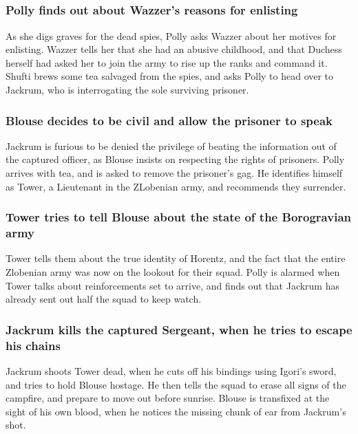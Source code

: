 \subsection{}
\subsubsection{\Gls{Polly} finds out about \Gls{Wazzer}'s reasons for enlisting}
As she digs graves for the dead spies, \Gls{Polly} asks \Gls{Wazzer} about her motives for
enlisting. \Gls{Wazzer} tells her that she had an abusive childhood, and that \Gls{Duchess} herself
had asked her to join the army to rise up the ranks and command it. \Gls{Shufti} brews some tea
salvaged from the spies, and asks \Gls{Polly} to head over to \Gls{Jackrum}, who is interrogating
the sole surviving prisoner.

\subsubsection{\Gls{Blouse} decides to be civil and allow the prisoner to speak}
\Gls{Jackrum} is furious to be denied the privilege of beating the information out of the captured
officer, as \Gls{Blouse} insists on respecting the rights of prisoners. \Gls{Polly} arrives with
tea, and is asked to remove the prisoner's gag. He identifies himself as \Gls{Tower}, a Lieutenant
in the ZLobenian army, and recommends they surrender.

\subsubsection{\Gls{Tower} tries to tell \Gls{Blouse} about the state of the Borogravian army}
\Gls{Tower} tells them about the true identity of \Gls{Horentz}, and the fact that the entire
Zlobenian army was now on the lookout for their squad. \Gls{Polly} is alarmed when \Gls{Tower} talks
about reinforcements set to arrive, and finds out that \Gls{Jackrum} has already sent out half the
squad to keep watch.

\subsubsection{\Gls{Jackrum} kills the captured Sergeant, when he tries to escape his chains}
\Gls{Jackrum} shoots \Gls{Tower} dead, when he cuts off his bindings using \Gls{Igori}'s sword, and
tries to hold \Gls{Blouse} hostage. He then tells the squad to erase all signs of the campfire, and
prepare to move out before sunrise. \Gls{Blouse} is transfixed at the sight of his own blood, when
he notices the missing chunk of ear from \Gls{Jackrum}'s shot.

